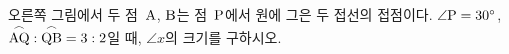 \noindent\begin{minipage}[t]{0.58\linewidth}\vspace{0pt}\raggedright 오른쪽 그림에서 두 점~$\mathrm{A}$, $\mathrm{B}$는 점~$\mathrm{P}$에서 원에 그은 두 접선의 접점이다. $\angle\mathrm{P}=30^\circ$, $\overset{\frown}{\mathrm{AQ}}:\overset{\frown}{\mathrm{QB}}=3:2$일 때, $\angle x$의 크기를 구하시오.\end{minipage}\hfill\begin{minipage}[t]{0.4\linewidth}\vspace{0pt}\centering \resizebox{\ifdim\width>\linewidth\linewidth\else\width\fi}{!}{}\end{minipage}\par
